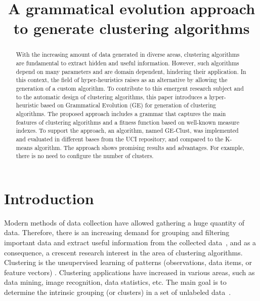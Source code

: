 \documentclass[conference]{IEEEtran}
\begin{document}
	
	\title{A grammatical evolution approach to generate clustering algorithms}
	
	
	\author{
		
		
		
	}
	
	\maketitle
	
	\begin{abstract} 
		
		With the increasing amount of data generated in diverse areas, clustering algorithms are fundamental to extract hidden and useful information. However, such algorithms depend on many parameters and are domain dependent, hindering their application. In this context, the field of hyper-heuristics raises as an alternative by allowing the generation of a custom algorithm. To contribute to this emergent research subject and to the automatic design of clustering algorithms, this paper introduces a hyper-heuristic based on Grammatical Evolution (GE) for generation of clustering algorithms. The proposed approach includes a grammar that captures the main features of clustering algorithms and a fitness function based on well-known measure indexes. To support the approach, an algorithm, named GE-Clust, was implemented and evaluated in different bases from the UCI repository, and compared to the K-means algorithm. The approach  shows promising results  and advantages. For example, there is no need to configure the number of clusters.
		
	\end{abstract}
	
	
	\IEEEpeerreviewmaketitle
	
	
	\section{Introduction}
	
	
	Modern methods of data collection have allowed gathering a huge quantity of data. Therefore, there is an increasing demand for grouping and filtering important data and extract useful information from the collected data~\cite{ahalya2015data}, and as a consequence, a crescent research interest in the area of clustering algorithms. Clustering is the unsupervised learning of patterns (observations, data items, or feature vectors) \cite{jain1988algorithms}. Clustering applications have increased in various areas, such as data mining, image recognition, data statistics, etc. The main goal is to determine the intrinsic grouping (or clusters) in a set of unlabeled data~\cite{ahalya2015data}.
	
\end{document}
